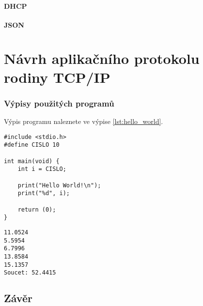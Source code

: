 \documentclass[12pt]{report}			%
\begin{document}
\url{}
\url{}
\url{}
\url{}

				\subsection{DHCP}

\url{}
\url{}
\url{}
\url{}

				\subsection{JSON}

\url{}
\url{}
\url{}
\url{}



				\subsection{}
			

	\part{Návrh aplikačního protokolu rodiny TCP/IP}

\section{Výpisy použitých programů}

\lipsum[1]	

Výpis programu   naleznete ve výpise \ref{lst:hello_world}.

\begin{lstlisting}[title={Program hello.c}, caption={hello.c}, label={lst:hello_world}]
#include <stdio.h>
#define CISLO 10

int main(void) {
	int i = CISLO;

	print("Hello World!\n");
	print("%d", i);

	return (0);
}
\end{lstlisting}

\lipsum[1]	

\begin{lstlisting}[numbers=none, title={Příklad výstupního souboru}]
11.0524
5.5954
6.7996
13.8584
15.1357
Soucet: 52.4415
\end{lstlisting}

	\chapter*{Závěr}
	
		\lipsum[1]
	
\end{document}
